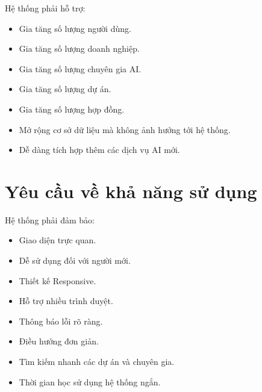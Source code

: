 Hệ thống phải hỗ trợ:

\begin{itemize}

\item Gia tăng số lượng người dùng.

\item Gia tăng số lượng doanh nghiệp.

\item Gia tăng số lượng chuyên gia AI.

\item Gia tăng số lượng dự án.

\item Gia tăng số lượng hợp đồng.

\item Mở rộng cơ sở dữ liệu mà không ảnh hưởng tới hệ thống.

\item Dễ dàng tích hợp thêm các dịch vụ AI mới.

\end{itemize}


\section{Yêu cầu về khả năng sử dụng}

Hệ thống phải đảm bảo:

\begin{itemize}

\item Giao diện trực quan.

\item Dễ sử dụng đối với người mới.

\item Thiết kế Responsive.

\item Hỗ trợ nhiều trình duyệt.

\item Thông báo lỗi rõ ràng.

\item Điều hướng đơn giản.

\item Tìm kiếm nhanh các dự án và chuyên gia.

\item Thời gian học sử dụng hệ thống ngắn.

\end{itemize}

